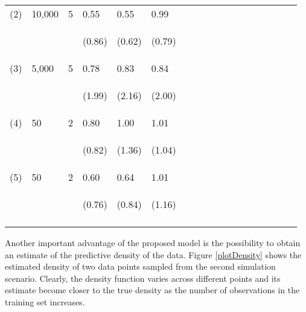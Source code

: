 \documentclass{article}
\begin{document}
\begin{table}[t]
\begin{center}
\begin{small}
\begin{sc}
\begin{tabular}{llllllllllllllllll}
(2)&10,000& 5&0.55& 0.55 &0.99\\ 
&&& \begin{scriptsize} (0.86)\end{scriptsize} & \begin{scriptsize} (0.62)\end{scriptsize} & \begin{scriptsize} (0.79)\end{scriptsize}\\
(3)&5,000 &5&  0.78 &0.83 & 0.84\\
&&&   \begin{scriptsize} (1.99)\end{scriptsize} & \begin{scriptsize} (2.16)\end{scriptsize} & \begin{scriptsize} (2.00)\end{scriptsize}\\
(4)&50&2& 0.80&1.00&1.01 \\
&&& \begin{scriptsize} (0.82)\end{scriptsize}& \begin{scriptsize} (1.36)\end{scriptsize}& \begin{scriptsize} (1.04)\end{scriptsize}\\
(5) &50&2 & 0.60&0.64 &1.01\\  
&&& \begin{scriptsize} (0.76)\end{scriptsize}& \begin{scriptsize} (0.84)\end{scriptsize}& \begin{scriptsize} (1.16)\end{scriptsize}\\
\\
\hline
\end{tabular}
\end{sc}
\end{small}
\end{center}
\vskip -0.1in
\end{table}

Another important advantage of the proposed model is the possibility to obtain an estimate of the predictive density of the data. Figure \ref{plotDensity} shows the estimated density of two data points sampled from the second simulation scenario. Clearly, the density function varies  across different points and its estimate become closer to the true density as the number of observations in the training set increases.
\end{document}
